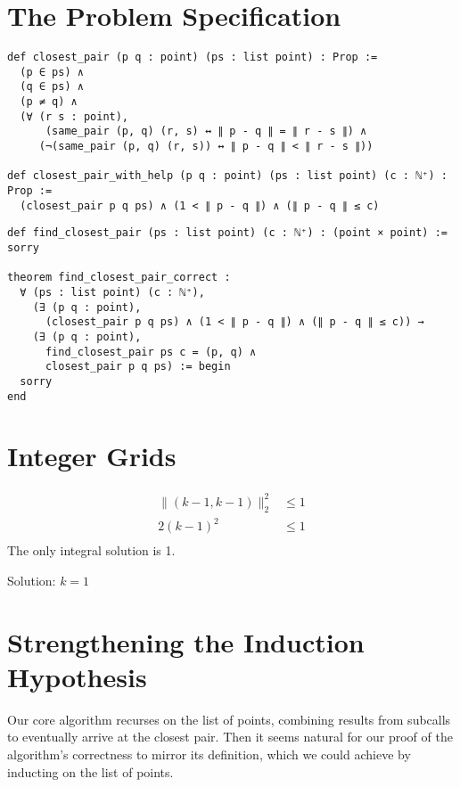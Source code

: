 \documentclass{article}
\begin{document}
\section{The Problem Specification}

\begin{verbatim}
def closest_pair (p q : point) (ps : list point) : Prop :=
  (p ∈ ps) ∧
  (q ∈ ps) ∧
  (p ≠ q) ∧
  (∀ (r s : point),
      (same_pair (p, q) (r, s) ↔ ∥ p - q ∥ = ∥ r - s ∥) ∧
     (¬(same_pair (p, q) (r, s)) ↔ ∥ p - q ∥ < ∥ r - s ∥))

def closest_pair_with_help (p q : point) (ps : list point) (c : ℕ⁺) : Prop :=
  (closest_pair p q ps) ∧ (1 < ∥ p - q ∥) ∧ (∥ p - q ∥ ≤ c)
\end{verbatim}
\newpage


\begin{verbatim}
def find_closest_pair (ps : list point) (c : ℕ⁺) : (point × point) := sorry

theorem find_closest_pair_correct :
  ∀ (ps : list point) (c : ℕ⁺),
    (∃ (p q : point),
      (closest_pair p q ps) ∧ (1 < ∥ p - q ∥) ∧ (∥ p - q ∥ ≤ c)) →
    (∃ (p q : point),
      find_closest_pair ps c = (p, q) ∧
      closest_pair p q ps) := begin
  sorry
end
\end{verbatim}


\section{Integer Grids}
\begin{align*}
  \| (k - 1, k-1) \|_2^2 &\leq 1 \\
  2(k-1)^2 & \leq 1 \\
\end{align*}
The only integral solution is 1.

Solution: $k=1$

\section{Strengthening the Induction Hypothesis}
Our core algorithm recurses on the list of points, combining results from subcalls to eventually arrive at the closest pair.
Then it seems natural for our proof of the algorithm's correctness to mirror its definition, which we could achieve by inducting on the list of points.
\end{document}
